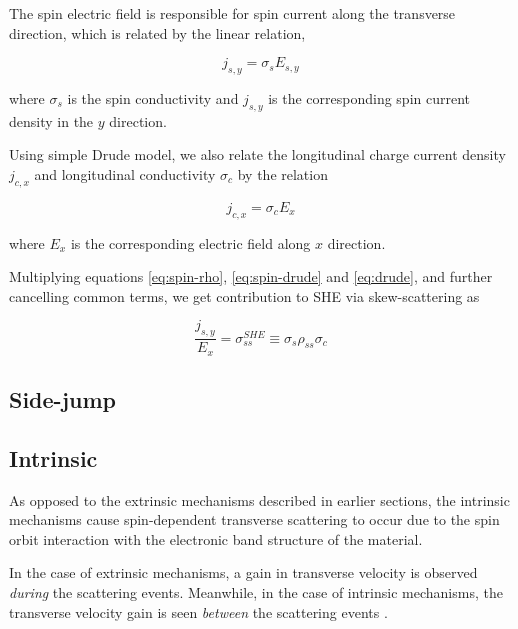 The spin electric field is responsible for spin current along the transverse direction, which is related by the linear relation,

\begin{equation} \label{eq:spin-drude}
    j_{s,y} = \sigma_s E_{s,y}
\end{equation}

where \( \sigma_s \) is the spin conductivity and \( j_{s,y} \) is the corresponding spin current density in the \( y \) direction.

Using simple Drude model, we also relate the longitudinal charge current density \( j_{c,x} \) and longitudinal conductivity \( \sigma_c \) by the relation

\begin{equation} \label{eq:drude}
    j_{c,x} = \sigma_c E_x
\end{equation}

where \( E_x \) is the corresponding electric field along \( x \) direction.

Multiplying equations \ref{eq:spin-rho}, \ref{eq:spin-drude} and \ref{eq:drude}, and further cancelling common terms, we get contribution to SHE via skew-scattering as

\begin{equation} \label{eq:skew-conductivity}
    \boxed{\frac{j_{s,y}}{E_x} = \sigma_{ss}^{SHE} \equiv \sigma_s \rho_{ss} \sigma_c}
\end{equation}


\subsection*{Side-jump}


\subsection{Intrinsic}

As opposed to the extrinsic mechanisms described in earlier sections, the intrinsic mechanisms cause spin-dependent transverse scattering to occur due to the spin orbit interaction with the electronic band structure of the material.

In the case of extrinsic mechanisms, a gain in transverse velocity is observed \emph{during} the scattering events.
Meanwhile, in the case of intrinsic mechanisms, the transverse velocity gain is seen \emph{between} the scattering events \cite{hoffmann2013spin}.
